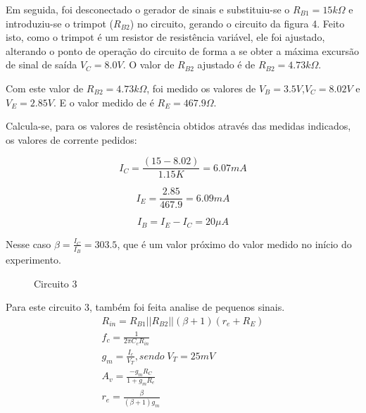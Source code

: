 \documentclass[a4paper]{article} %
\begin{document}
Em seguida, foi desconectado o gerador de sinais e substituiu-se o $R_{B1}=15k\Omega$
e introduziu-se o trimpot ($R_{B2}$) no circuito, gerando o circuito da figura 4. Feito isto,
como o trimpot é um resistor de resistência variável, ele foi ajustado, alterando o
ponto de operação do circuito de forma a se obter a máxima excursão de sinal de saída
$V_C=8.0V$. O valor de $R_{B2}$ ajustado é de $R_{B2}=4.73k\Omega$.

Com este valor de $R_{B2}=4.73k\Omega$, foi medido os valores de
$V_B=3.5V$,$V_C=8.02V$ e $V_E=2.85V$. E o valor medido de é $R_E=467.9\Omega$.

Calcula-se, para os valores de resistência obtidos através das medidas indicados, os
valores de corrente pedidos:

\begin{displaymath}
I_C =\frac{(15-8.02)}{1.15K} = 6.07 mA
\end{displaymath}

\begin{displaymath}
I_E =\frac{2.85}{467.9} = 6.09 mA
\end{displaymath}

\begin{displaymath}
I_B = I_E - I_C = 20 \mu A
\end{displaymath}

Nesse caso $\beta = \frac{I_C}{I_B} = 303.5$, que é um valor próximo do valor medido no início do
experimento.


\vspace{3mm}
\begin{figure}[h!]
\centerline{}
\caption{Circuito 3\label{circ:3}}
\end{figure}


Para este circuito 3, também foi feita analise de pequenos sinais.
\begin{eqnarray}
R_{in}=R_{B1}||R_{B2}||(\beta+1)(r_{e}+R_E)\\
f_c=\frac{1}{2\pi C_cR_{in}}\\
g_m=\frac{I_c}{V_T},sendo \; V_T = 25 mV\\
A_v=\frac{-g_mR_C}{1+g_mR_e}\\
r_{e}=\frac{\beta}{(\beta+1)g_m}
\end{eqnarray}
\end{document}
